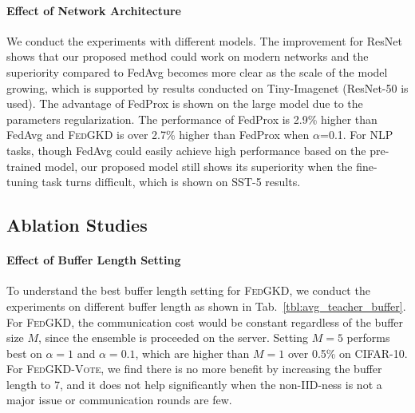 \documentclass{article} %
\newcommand{\system}{\textsc{FedGKD}\xspace}
\newcommand{\systemled}{\textsc{FedGKD-Vote}\xspace}
\begin{document}
\paragraph{Effect of Network Architecture}
We conduct the experiments with different models. The improvement for ResNet shows that our proposed method could work on modern networks and the superiority compared to FedAvg becomes more clear as the scale of the model growing, which is supported by results conducted on Tiny-Imagenet (ResNet-50 is used). The advantage of FedProx is shown on the large model due to the parameters regularization. The performance of FedProx is 2.9\% higher than FedAvg and \system is over 2.7\% higher than FedProx when $\alpha$=0.1.  For NLP tasks, though FedAvg could easily achieve high performance based on the pre-trained model, our proposed model still shows its superiority when the fine-tuning task turns difficult, which is shown on SST-5 results.

\subsection{Ablation Studies}

\paragraph{Effect of Buffer Length Setting}
To understand the best buffer length setting for \system, we conduct the experiments on different buffer length as shown in Tab.~\ref{tbl:avg_teacher_buffer}. For \system, the communication cost would be constant regardless of the buffer size $M$, since the ensemble is proceeded on the server. Setting $M=5$ performs best on $\alpha=1$ and $\alpha=0.1$, which are higher than $M=1$ over 0.5\% on CIFAR-10. For \systemled, we find there is no more benefit by increasing the buffer length to 7, and it does not help significantly when the non-IID-ness is not a major issue or communication rounds are few. 
\end{document}
